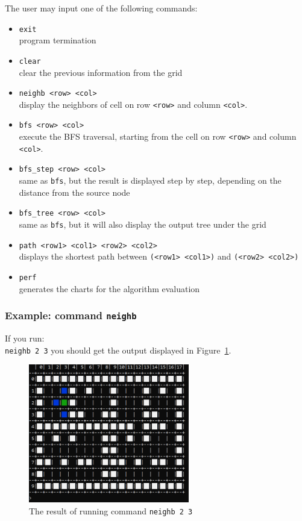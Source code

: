 \documentclass[../en-fa-lab.tex]{subfiles}
\begin{document}
The user may input one of the following commands:
\begin{itemize}
    \item \texttt{exit}\\
        program termination
    \item \texttt{clear}\\
        clear the previous information from the grid
    \item \texttt{neighb <row> <col>} \\
        display the neighbors of cell on row \texttt{<row>} and column \texttt{<col>}.
    \item \texttt{bfs <row> <col>} \\
        execute the BFS traversal, starting from the cell on row \texttt{<row>} and column \texttt{<col>}.
    \item \texttt{bfs\_step <row> <col>} \\
        same as \texttt{bfs}, but the result is displayed step by step, depending on the distance from the source node
    \item \texttt{bfs\_tree <row> <col>} \\
        same as \texttt{bfs},  but it will also display the output tree under the grid
    \item \texttt{path <row1> <col1> <row2> <col2>} \\
        displays the shortest path between  \texttt{(<row1> <col1>)} and \texttt{(<row2> <col2>)}
    \item \texttt{perf} \\
        generates the charts for the algorithm evaluation
\end{itemize}

\subsubsection{Example: command \texttt{neighb}}
If you run:\\
\texttt{neighb 2 3}
you should get the output displayed in Figure~\ref{fig:neighb}.

\begin{figure}[h]
    \centering
    \includegraphics[width=7cm]{../Resources/lab9/grid_neighb.png}
    \caption{The result of running command \texttt{neighb 2 3}}
    \label{fig:neighb}
\end{figure}
\end{document}

